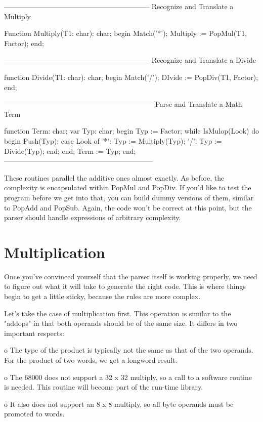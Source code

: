 \documentclass[float=false, crop=false]{standalone}
\begin{document}
{--------------------------------------------------------------}
{ Recognize and Translate a Multiply }

Function Multiply(T1: char): char;
begin
   Match('*');
   Multiply := PopMul(T1, Factor);
end;


{--------------------------------------------------------------}
{ Recognize and Translate a Divide }

function Divide(T1: char): char;
begin
   Match('/');
   DIvide := PopDiv(T1, Factor);
end;


{---------------------------------------------------------------}
{ Parse and Translate a Math Term }

function Term: char;
var Typ: char;
begin
   Typ := Factor;
   while IsMulop(Look) do begin
      Push(Typ);
      case Look of
       '*': Typ := Multiply(Typ);
       '/': Typ := Divide(Typ);
      end;
   end;
   Term := Typ;
end;
{---------------------------------------------------------------}


These routines parallel the additive ones almost exactly. As before, the
complexity is encapsulated within PopMul and PopDiv. If you'd like to test the
program before we get into that, you can build dummy versions of them, similar
to PopAdd and PopSub. Again, the code won't be correct at this point, but the
parser should handle expressions of arbitrary complexity.


\section{Multiplication}

Once you've convinced yourself that the parser itself is working properly, we
need to figure out what it will take to generate the right code. This is where
things begin to get a little sticky, because the rules are more complex.

Let's take the case of multiplication first. This operation is similar to the
"addops" in that both operands should be of the same size. It differs in two
important respects:


  o  The type of the product is typically not the same as that of
     the  two  operands.   For the product of two words, we get a
     longword result.

  o  The 68000 does  not support a 32 x 32 multiply, so a call to
     a software routine is needed.  This routine will become part
     of the run-time library.

  o  It also does  not  support  an  8  x 8 multiply, so all byte
     operands must be promoted to words.
\end{document}
